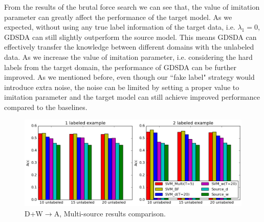 From the results of the brutal force search we can see that, the value of imitation parameter can greatly affect the performance of the target model.
As we expected, without using any true label information of the target data, i.e. $\lambda_1 = 0$, GDSDA can still slightly outperform the source model. This means GDSDA can effectively transfer the knowledge between different domains with the unlabeled data. As we increase the value of imitation parameter, i.e. considering the hard labels from the target domain, the performance of GDSDA can be further improved. As we mentioned before, even though our ``fake label" strategy would introduce extra noise, the noise can be limited by setting a proper value to imitation parameter and the target model can still achieve improved performance compared to the baselines.

\begin{figure}[h]
	\centering
	\includegraphics[scale=.50]{aaai/figure/cmp.png}
	\caption{D+W$\rightarrow$A, Multi-source results comparison.}\label{fig:multi}
\end{figure}
